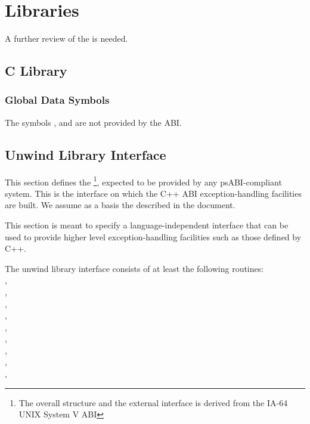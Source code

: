 
\chapter{Libraries}

A further review of the \intelabi is needed.

\section{C Library}

\subsection{Global Data Symbols}

The symbols ,  and 
are not provided by the \xARCH ABI.

\section{Unwind Library Interface}

This section defines the %
\footnote{The overall structure and the external interface is derived 
from the IA-64 UNIX System V ABI}, 
expected to be provided by any \xARCH psABI-compliant system. 
This is the interface on which the C++ ABI exception-handling 
facilities are built. We assume as a basis the
 described in the 
 document.

This section is meant to specify a language-independent interface that
can be used to provide higher level exception-handling facilities such
as those defined by C++.

The unwind library interface consists of at least the following routines:\\
,\\
,\\
,\\
,\\
,\\
,\\
,\\
,\\
,\\

